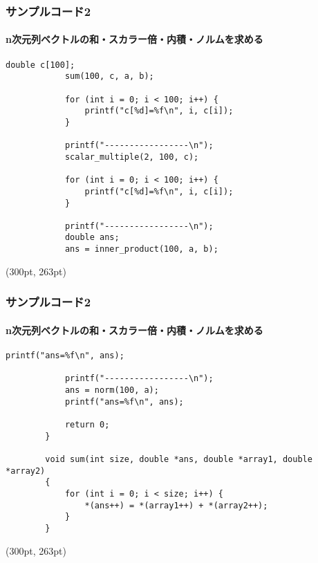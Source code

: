 \documentclass[dvipdfmx]{beamer}
\begin{document}
\begin{frame}[t, fragile]
    \frametitle{サンプルコード2}
    \framesubtitle{\textrm{n}次元列ベクトルの和・スカラー倍・内積・ノルムを求める}
    \begin{lstlisting}[gobble= 8, caption=pra\_pointer.c, firstnumber=19]
            double c[100];
            sum(100, c, a, b);

            for (int i = 0; i < 100; i++) {
                printf("c[%d]=%f\n", i, c[i]);
            }
            
            printf("-----------------\n");
            scalar_multiple(2, 100, c);

            for (int i = 0; i < 100; i++) {
                printf("c[%d]=%f\n", i, c[i]);
            }

            printf("-----------------\n");
            double ans;
            ans = inner_product(100, a, b);
    \end{lstlisting}
    \begin{textblock*}{0.3\linewidth}(300pt, 263pt)
        \space
    \end{textblock*}
\end{frame}

\begin{frame}[t, fragile]
    \frametitle{サンプルコード2}
    \framesubtitle{\textrm{n}次元列ベクトルの和・スカラー倍・内積・ノルムを求める}
    \begin{lstlisting}[gobble= 8, caption=pra\_pointer.c, firstnumber=36]
            printf("ans=%f\n", ans);
            
            printf("-----------------\n");
            ans = norm(100, a);
            printf("ans=%f\n", ans);
            
            return 0;
        }

        void sum(int size, double *ans, double *array1, double *array2)
        {
            for (int i = 0; i < size; i++) {
                *(ans++) = *(array1++) + *(array2++); 
            }
        }
    \end{lstlisting}
    \begin{textblock*}{0.3\linewidth}(300pt, 263pt)
        \space
    \end{textblock*}
\end{frame}
\end{document}
